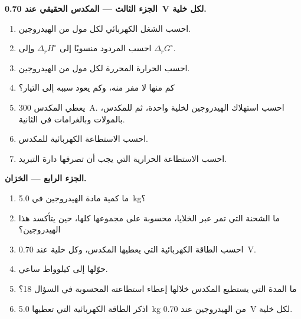\begin{problem}
\medskip
\noindent\textbf{الجزء الثالث --- المكدس الحقيقي عند \qty{0.70}{V} لكل خلية.}
\begin{enumerate}[resume]
  \item احسب الشغل الكهربائي لكل مول من الهيدروجين.
  \item احسب المردود منسوبًا إلى $\Delta_r H^\circ$ وإلى $\Delta_r G^\circ$.
  \item احسب الحرارة المحررة لكل مول من الهيدروجين.
  \item كم منها لا مفر منه، وكم يعود سببه إلى التيار؟
  \item يعطي المكدس \qty{300}{A}. احسب استهلاك الهيدروجين لخلية
        واحدة، ثم للمكدس، بالمولات وبالغرامات في الثانية.
  \item احسب الاستطاعة الكهربائية للمكدس.
  \item احسب الاستطاعة الحرارية التي يجب أن تصرفها دارة التبريد.
\end{enumerate}

\medskip
\noindent\textbf{الجزء الرابع --- الخزان.}
\begin{enumerate}[resume]
  \item ما كمية مادة الهيدروجين في \qty{5.0}{kg}؟
  \item ما الشحنة التي تمر عبر الخلايا، محسوبة على مجموعها كلها، حين
        يتأكسد هذا الهيدروجين؟
  \item احسب الطاقة الكهربائية التي يعطيها المكدس، وكل خلية عند
        \qty{0.70}{V}.
  \item حوّلها إلى كيلوواط ساعي.
  \item ما المدة التي يستطيع المكدس خلالها إعطاء استطاعته المحسوبة في السؤال 18؟
  \item اذكر الطاقة الكهربائية التي تعطيها \qty{5.0}{kg} من الهيدروجين عند
        \qty{0.70}{V} لكل خلية.
\end{enumerate}
\end{problem}
